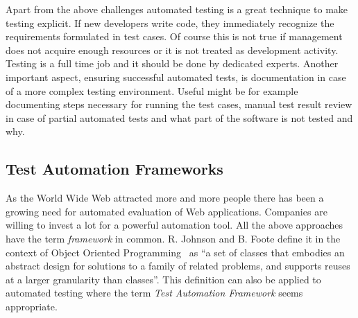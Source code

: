 \documentclass[12pt, notitlepage]{article}
\begin{document}
Apart from the above challenges automated testing is a great technique to make testing explicit. If new developers write code, they immediately recognize 
the requirements formulated in test cases. Of course this is not true if management does not acquire enough resources or it is not treated as development activity.
Testing is a full time job and it should be done by dedicated experts.
Another important aspect, ensuring successful automated tests, is documentation in case of a more complex testing environment. Useful might be for example
documenting steps necessary for running the test cases, manual test result review in case of partial automated tests and what part of the software is not
tested and why. 
\subsection{Test Automation Frameworks}
As the World Wide Web attracted more and more people there has been a growing need for automated evaluation of Web applications. Companies are willing to
invest a lot for a powerful automation tool. All the above approaches have the term \textit{framework} in common. R. Johnson and B. Foote define it
in the context of Object Oriented Programming~\cite{oop} as
\enquote{a set of classes that embodies an abstract design for solutions to a family of related problems, and supports reuses at a larger granularity than classes}.
This definition can also be applied to automated testing where the term \textit{Test Automation Framework} seems appropriate.
\end{document}
